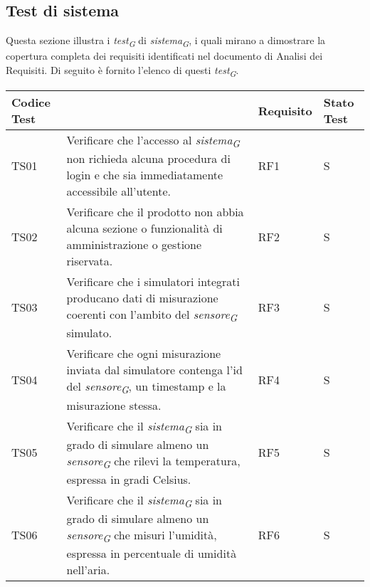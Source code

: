 \subsection{Test di sistema}
Questa sezione illustra i \textit{test}\textsubscript{\textit{G}} di \textit{sistema}\textsubscript{\textit{G}}, i quali mirano a dimostrare la copertura completa dei requisiti identificati nel documento di Analisi dei Requisiti. Di seguito è fornito l'elenco di questi \textit{test}\textsubscript{\textit{G}}.

\vspace{0.4cm}

\begin{longtable}{|C{1.9cm}|L{5cm}|C{2cm}|C{2cm}|}
    \hline
    \textbf{Codice Test} &  & \textbf{Requisito} & \textbf{Stato Test} \\
    \hline \hline

    TS01 & Verificare che l'accesso al \textit{sistema}\textsubscript{\textit{G}} non richieda alcuna procedura di login e che sia immediatamente accessibile all'utente. & RF1 & S \\
    \hline

    TS02 & Verificare che il prodotto non abbia alcuna sezione o funzionalità di amministrazione o gestione riservata. & RF2 & S \\
    \hline

    TS03 & Verificare che i simulatori integrati producano dati di misurazione coerenti con l'ambito del \textit{sensore}\textsubscript{\textit{G}} simulato. & RF3 & S \\
    \hline

    TS04 & Verificare che ogni misurazione inviata dal simulatore contenga l'id del \textit{sensore}\textsubscript{\textit{G}}, un timestamp e la misurazione stessa. & RF4 & S \\
    \hline

    TS05 & Verificare che il \textit{sistema}\textsubscript{\textit{G}} sia in grado di simulare almeno un \textit{sensore}\textsubscript{\textit{G}} che rilevi la temperatura, espressa in gradi Celsius. & RF5 & S \\
    \hline

    TS06 & Verificare che il \textit{sistema}\textsubscript{\textit{G}} sia in grado di simulare almeno un \textit{sensore}\textsubscript{\textit{G}} che misuri l'umidità, espressa in percentuale di umidità nell'aria. & RF6 & S \\
    \hline


\end{longtable}
